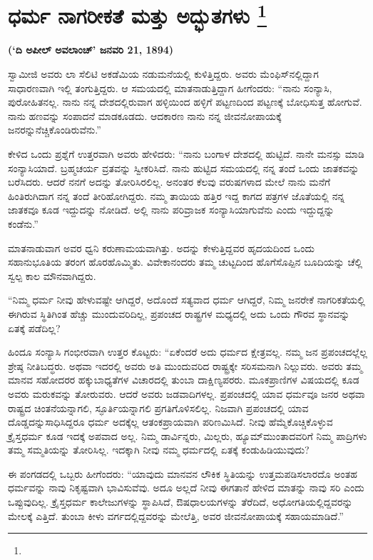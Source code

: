 
\chapter[ಧರ್ಮ ನಾಗರೀಕತೆ ಮತ್ತು ಅದ್ಭುತಗಳು ]{ಧರ್ಮ ನಾಗರೀಕತೆ ಮತ್ತು ಅದ್ಭುತಗಳು \protect\footnote{}}

\centerline{\textbf{(‘ದಿ ಅಪೀಲ್​ ಅವಲಾಂಚ್​’ ಜನವರಿ 21, 1894)}}

ಸ್ವಾಮೀಜಿ ಅವರು ಲಾ ಸೆಲಿಟಿ ಅಕಡೆಮಿಯ ನಡುಮನೆಯಲ್ಲಿ ಕುಳಿತ್ತಿದ್ದರು. ಅವರು ಮೆಂಫಿಸ್​ನಲ್ಲಿದ್ದಾಗ ಸಾಧಾರಣವಾಗಿ ಇಲ್ಲಿ ತಂಗುತ್ತಿದ್ದರು. ಆ ಸಮಯದಲ್ಲಿ ಮಾತನಾಡುತ್ತಿದ್ದಾಗ ಹೀಗೆಂದರು: “ನಾನು ಸಂನ್ಯಾಸಿ, ಪುರೋಹಿತನಲ್ಲ. ನಾನು ನನ್ನ ದೇಶದಲ್ಲಿರುವಾಗ ಹಳ್ಳಿಯಿಂದ ಹಳ್ಳಿಗೆ ಪಟ್ಟಣದಿಂದ ಪಟ್ಟಣಕ್ಕೆ ಬೋಧಿಸುತ್ತ ಹೋಗುವೆ. ನಾನು ಹಣವನ್ನು ಸಂಪಾದನೆ ಮಾಡಕೂಡದು. ಆದಕಾರಣ ನಾನು ನನ್ನ ಜೀವನೋಪಾಯಕ್ಕೆ ಜನರನ್ನು\break ನೆಚ್ಚಿಕೊಂಡಿರುವೆನು.”

ಕೇಳಿದ ಒಂದು ಪ್ರಶ್ನೆಗೆ ಉತ್ತರವಾಗಿ ಅವರು ಹೇಳಿದರು: “ನಾನು ಬಂಗಾಳ ದೇಶದಲ್ಲಿ ಹುಟ್ಟಿದೆ. ನಾನೇ ಮನಸ್ಸು ಮಾಡಿ ಸಂನ್ಯಾಸಿಯಾದೆ. ಬ್ರಹ್ಮಚರ್ಯ ವ್ರತವನ್ನು ಸ್ವೀಕರಿಸಿದೆ. ನಾನು ಹುಟ್ಟಿದ ಸಮಯದಲ್ಲಿ ನನ್ನ ತಂದೆ ಒಂದು ಜಾತಕವನ್ನು ಬರೆಸಿದರು. ಆದರೆ ನನಗೆ ಅದನ್ನು ತೋರಿಸಿರಲಿಲ್ಲ. ಅನಂತರ ಕೆಲವು ವರುಷಗಳಾದ ಮೇಲೆ ನಾನು ಮನೆಗೆ ಹಿಂತಿರುಗಿದಾಗ ನನ್ನ ತಂದೆ ತೀರಿಹೋಗಿದ್ದರು. ನಮ್ಮ ತಾಯಿಯ ಹತ್ತಿರ ಇದ್ದ ಕಾಗದ ಪತ್ರಗಳ ಜೊತೆಯಲ್ಲಿ ನನ್ನ ಜಾತಕವೂ ಕೂಡ ಇದ್ದುದನ್ನು ನೋಡಿದೆ. ಅಲ್ಲಿ ನಾನು ಪರಿವ್ರಾಜಕ ಸಂನ್ಯಾಸಿಯಾಗುವೆನು ಎಂದು ಇದ್ದುದ್ದನ್ನು ಕಂಡೆನು.”

ಮಾತನಾಡುವಾಗ ಅವರ ಧ್ವನಿ ಕರುಣಾಮಯವಾಗಿತ್ತು. ಅದನ್ನು ಕೇಳುತ್ತಿದ್ದವರ ಹೃದಯದಿಂದ ಒಂದು ಸಹಾನುಭೂತಿಯ ತರಂಗ ಹೊರಹೊಮ್ಮಿತು. ವಿವೇಕಾನಂದರು ತಮ್ಮ ಚುಟ್ಟದಿಂದ ಹೊಗೆಸೊಪ್ಪಿನ ಬೂದಿಯನ್ನು ಚೆಲ್ಲಿ ಸ್ವಲ್ಪ ಕಾಲ ಮೌನವಾಗಿದ್ದರು.

“ನಿಮ್ಮ ಧರ್ಮ ನೀವು ಹೇಳುವಷ್ಟೇ ಆಗಿದ್ದರೆ, ಅದೊಂದೆ ಸತ್ಯವಾದ ಧರ್ಮ ಆಗಿದ್ದರೆ, ನಿಮ್ಮ ಜನರೇಕೆ ನಾಗರಿಕತೆಯಲ್ಲಿ ಈಗಿರುವ ಸ್ಥಿತಿಗಿಂತ ಹೆಚ್ಚು ಮುಂದುವರಿದಿಲ್ಲ, ಪ್ರಪಂಚದ ರಾಷ್ಟ್ರಗಳ ಮಧ್ಯದಲ್ಲಿ ಅದು ಒಂದು ಗೌರವ ಸ್ಥಾನವನ್ನು ಏತಕ್ಕೆ ಪಡೆದಿಲ್ಲ?

ಹಿಂದೂ ಸಂನ್ಯಾಸಿ ಗಂಭೀರವಾಗಿ ಉತ್ತರ ಕೊಟ್ಟರು: “ಏಕೆಂದರೆ ಅದು ಧರ್ಮದ ಕ್ಷೇತ್ರವಲ್ಲ. ನಮ್ಮ ಜನ ಪ್ರಪಂಚದಲ್ಲೆಲ್ಲ ಶ್ರೇಷ್ಠ ನೀತಿಬದ್ಧರು. ಅಥವಾ ಇದರಲ್ಲಿ ಅವರು ಅತಿ ಮುಂದುವರಿದ ರಾಷ್ಟ್ರಕ್ಕೇ ಸರಿಸಮನಾಗಿ ನಿಲ್ಲುವರು. ಅವರು ತಮ್ಮ ಮಾನವ ಸಹೋದರರ ಹಕ್ಕುಬಾಧ್ಯತೆಗಳ ವಿಚಾರದಲ್ಲಿ ತುಂಬಾ ದಾಕ್ಷಿಣ್ಯಪರರು. ಮೂಕಪ್ರಾಣಿಗಳ ವಿಷಯದಲ್ಲಿ ಕೂಡ ಅವರು ಮರುಕವನ್ನು ತೋರುವರು. ಆದರೆ ಅವರು ಜಡವಾದಿಗಳಲ್ಲ. ಪ್ರಪಂಚದಲ್ಲಿ ಯಾವ ಧರ್ಮವೂ ಜನರ ಅಥವಾ ರಾಷ್ಟ್ರದ ಚಿಂತನೆಯನ್ನಾಗಲಿ, ಸ್ಫೂರ್ತಿಯನ್ನಾಗಲಿ ಪ್ರಗತಿಗೊಳಿಸಲಿಲ್ಲ. ನಿಜವಾಗಿ ಪ್ರಪಂಚದಲ್ಲಿ ಯಾವ ದೊಡ್ಡದನ್ನು\break ಸಾಧಿಸಿದ್ದರೂ ಧರ್ಮ ಅದಕ್ಕೆಲ್ಲ ಆತಂಕಪ್ರಾಯವಾಗಿ ಪರಿಣಮಿಸಿದೆ. ನೀವು ಹೆಮ್ಮೆ\break ಕೊಚ್ಚಿಕೊಳ್ಳುವ ಕ್ರೈಸ್ತಧರ್ಮ ಕೂಡ ಇದಕ್ಕೆ ಅಪವಾದ ಅಲ್ಲ. ನಿಮ್ಮ ಡಾರ್ವಿನ್ನರು, ಮಿಲ್ಲರು, ಹ್ಯೂಮ್​ ಮುಂತಾದವರಿಗೆ ನಿಮ್ಮ ಪಾದ್ರಿಗಳು ತಮ್ಮ ಸಮ್ಮತಿಯನ್ನು ತೋರಿಸಿಲ್ಲ. ಇದಕ್ಕಾಗಿ ನೀವು ನಮ್ಮ ಧರ್ಮದಲ್ಲಿ ಏತಕ್ಕೆ ಕಂಡುಹಿಡಿಯುವುದು?

ಈ ಪಂಗಡದಲ್ಲಿ ಒಬ್ಬರು ಹೀಗೆಂದರು: “ಯಾವುದು ಮಾನವನ ಲೌಕಿಕ ಸ್ಥಿತಿಯನ್ನು ಉತ್ತಮಪಡಿಸಲಾರದೊ ಅಂತಹ ಧರ್ಮವನ್ನು ನಾವು ನಿಕೃಷ್ಟವಾಗಿ ಭಾವಿಸುವೆವು. ಅದೂ ಅಲ್ಲದೆ ನೀವು ಈಗತಾನೆ ಹೇಳಿದ ಮಾತನ್ನು ನಾವು ಸರಿ ಎಂದು ಒಪ್ಪುವುದಿಲ್ಲ. ಕ್ರೈಸ್ತಧರ್ಮ ಕಾಲೇಜುಗಳನ್ನು ಸ್ಥಾಪಿಸಿದೆ, ಔಷಧಾಲಯಗಳನ್ನು ತೆರೆದಿದೆ, ಅಧೋಗತಿಯಲ್ಲಿದ್ದವರನ್ನು ಮೇಲಕ್ಕೆ ಎತ್ತಿದೆ. ತುಂಬಾ ಕೀಳು ವರ್ಗದಲ್ಲಿದ್ದವರನ್ನು ಮೇಲೆತ್ತಿ, ಅವರ ಜೀವನೋಪಾ\-ಯಕ್ಕೆ ಸಹಾಯಮಾಡಿದೆ.”

